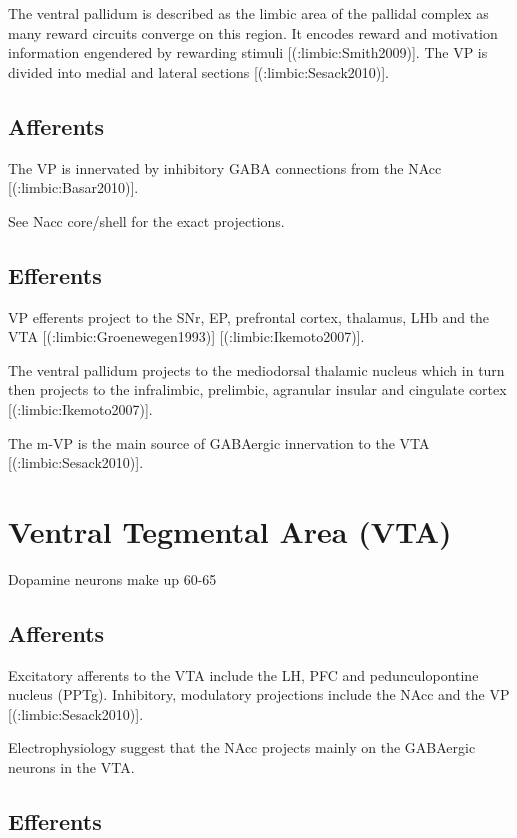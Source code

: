 {{The ventral pallidum is described as the limbic area of the pallidal complex as
many reward circuits converge on this region. It encodes reward and motivation
information engendered by rewarding stimuli [(:limbic:Smith2009)]. The VP is divided into medial
and lateral sections [(:limbic:Sesack2010)].

\subsection{Afferents}

The VP is innervated by inhibitory GABA connections from the
NAcc [(:limbic:Basar2010)]. 

See Nacc core/shell for the exact projections.

\subsection{Efferents}

VP efferents project to the SNr, EP, prefrontal cortex, thalamus, LHb and the VTA [(:limbic:Groenewegen1993)] [(:limbic:Ikemoto2007)].

The ventral pallidum projects to the mediodorsal thalamic nucleus which in turn then 
projects to the infralimbic, prelimbic, agranular insular and cingulate cortex [(:limbic:Ikemoto2007)].

The m-VP is the main source of GABAergic innervation to the VTA [(:limbic:Sesack2010)].


\section{Ventral Tegmental Area (VTA)}

Dopamine neurons make up 60-65%

\subsection{Afferents}

Excitatory afferents to the VTA include the LH, PFC and pedunculopontine nucleus
(PPTg). Inhibitory, modulatory projections include the NAcc and the VP [(:limbic:Sesack2010)].

Electrophysiology suggest that the NAcc projects mainly on the GABAergic neurons in the VTA.

\subsection{Efferents}

}}
